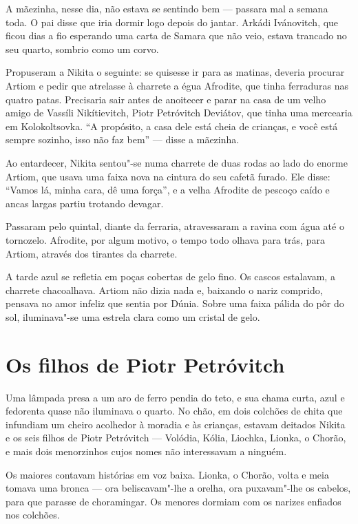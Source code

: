 A mãezinha, nesse dia, não estava se sentindo bem --- passara mal a
semana toda. O pai disse que iria dormir logo depois do jantar. Arkádi
Ivánovitch, que ficou dias a fio esperando uma carta de Samara que não
veio, estava trancado no seu quarto, sombrio como um corvo.

Propuseram a Nikita o seguinte: se quisesse ir para as matinas, deveria
procurar Artiom e pedir que atrelasse à charrete a égua Afrodite, que
tinha ferraduras nas quatro patas. Precisaria sair antes de anoitecer e
parar na casa de um velho amigo de Vassíli Nikítievitch, Piotr
Petróvitch Deviátov, que tinha uma mercearia em Kolokoltsovka. ``A
propósito, a casa dele está cheia de crianças, e você está sempre
sozinho, isso não faz bem'' --- disse a mãezinha.

Ao entardecer, Nikita sentou"-se numa charrete de duas rodas ao lado do
enorme Artiom, que usava uma faixa nova na cintura do seu cafetã furado.
Ele disse: ``Vamos lá, minha cara, dê uma força'', e a velha Afrodite de
pescoço caído e ancas largas partiu trotando devagar.

Passaram pelo quintal, diante da ferraria, atravessaram a ravina com água
até o tornozelo. Afrodite, por algum motivo, o tempo todo olhava para
trás, para Artiom, através dos tirantes da charrete.

A tarde azul se refletia em poças cobertas de gelo fino. Os cascos 
estalavam, a charrete chacoalhava. Artiom não dizia nada e, baixando o
nariz comprido, pensava no amor infeliz que sentia por Dúnia. Sobre uma
faixa pálida do pôr do sol, iluminava"-se uma estrela clara como um cristal de gelo.

\chapter{Os filhos de Piotr Petróvitch}

Uma lâmpada presa a um aro de ferro pendia do teto, e sua chama curta,
azul e fedorenta quase não iluminava o quarto. No chão, em dois colchões
de chita que infundiam um cheiro acolhedor à moradia e às crianças,
estavam deitados Nikita e os seis filhos de Piotr Petróvitch ---
Volódia, Kólia, Liochka, Lionka, o Chorão, e mais dois menorzinhos cujos
nomes não interessavam a ninguém.

Os maiores contavam histórias em voz baixa. Lionka, o Chorão, volta e
meia tomava uma bronca --- ora beliscavam"-lhe a orelha, ora puxavam"-lhe
os cabelos, para que parasse de choramingar. Os menores dormiam com os
narizes enfiados nos colchões.

